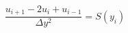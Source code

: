 \documentclass[preview,border=2pt]{standalone}
\begin{document}
\[
\frac{u_{i+1} - 2u_i + u_{i-1}}{\Delta y^2} = S(y_i)
\]
\end{document}
